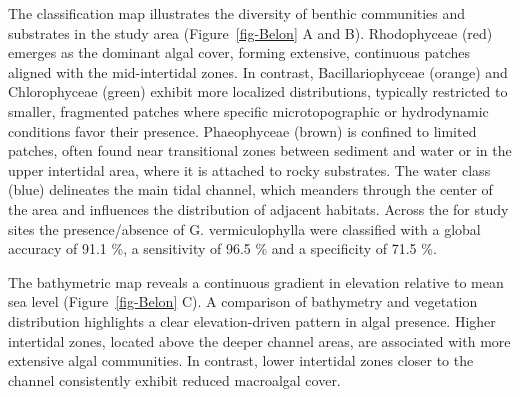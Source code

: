 \documentclass[
  letterpaper,
  DIV=11,
  numbers=noendperiod]{scrartcl}
\begin{document}
The classification map illustrates the diversity of benthic communities
and substrates in the study area (Figure~\ref{fig-Belon} A and B).
Rhodophyceae (red) emerges as the dominant algal cover, forming
extensive, continuous patches aligned with the mid-intertidal zones. In
contrast, Bacillariophyceae (orange) and Chlorophyceae (green) exhibit
more localized distributions, typically restricted to smaller,
fragmented patches where specific microtopographic or hydrodynamic
conditions favor their presence. Phaeophyceae (brown) is confined to
limited patches, often found near transitional zones between sediment
and water or in the upper intertidal area, where it is attached to rocky
substrates. The water class (blue) delineates the main tidal channel,
which meanders through the center of the area and influences the
distribution of adjacent habitats. Across the for study sites the
presence/absence of G. vermiculophylla were classified with a global
accuracy of 91.1 \%, a sensitivity of 96.5 \% and a specificity of 71.5
\%.

The bathymetric map reveals a continuous gradient in elevation relative
to mean sea level (Figure~\ref{fig-Belon} C). A comparison of bathymetry
and vegetation distribution highlights a clear elevation-driven pattern
in algal presence. Higher intertidal zones, located above the deeper
channel areas, are associated with more extensive algal communities. In
contrast, lower intertidal zones closer to the channel consistently
exhibit reduced macroalgal cover.
\end{document}
